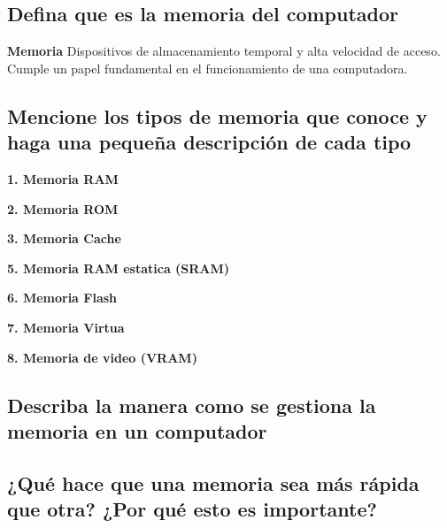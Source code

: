 \documentclass{article}
\begin{document}
	\subsection{Defina que es la memoria del computador}
	
	
	\begin{tcolorbox}[colupper=red!75!black]
		\textbf{Memoria}
		\tcblower
		Dispositivos de almacenamiento temporal y alta velocidad de acceso. Cumple un papel fundamental en el funcionamiento de una computadora.
	\end{tcolorbox}
	
	\subsection{Mencione los tipos de memoria que conoce y haga una pequeña descripción de cada tipo}
	
	\begin{tcolorbox}[colupper=red!75!black]
		\textbf{1. Memoria RAM}
		\tcblower
	\end{tcolorbox}
	\begin{tcolorbox}[colupper=red!75!black]
		\textbf{2. Memoria ROM}
		\tcblower
	\end{tcolorbox}
	\begin{tcolorbox}[colupper=red!75!black]
		\textbf{3. Memoria Cache}
		\tcblower
	\end{tcolorbox}
	\begin{tcolorbox}[colupper=red!75!black]
		\textbf{5. Memoria RAM estatica (SRAM)}
		\tcblower
	\end{tcolorbox}
	\begin{tcolorbox}[colupper=red!75!black]
		\textbf{6. Memoria Flash}
		\tcblower
	\end{tcolorbox}
	\begin{tcolorbox}[colupper=red!75!black]
		\textbf{7. Memoria Virtua}
		\tcblower
	\end{tcolorbox}
	\begin{tcolorbox}[colupper=red!75!black]
		\textbf{	8. Memoria de video (VRAM)}
		\tcblower
	\end{tcolorbox}
	\subsection{Describa la manera como se gestiona la memoria en un computador}
	
	\begin{tcolorbox}[colupper=red!75!black]
		\textbf{}
		\tcblower
		
	\end{tcolorbox}
	
	\subsection{¿Qué hace que una memoria sea más rápida que otra? ¿Por qué esto es importante?}
	
	
\end{document}
